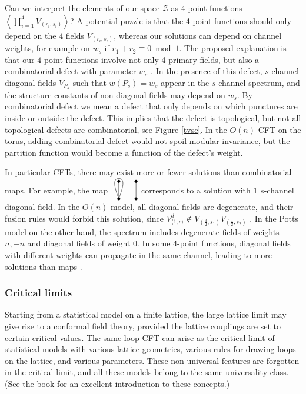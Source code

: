 \documentclass[12pt, a4paper]{article}
\newcommand{\vertices}{
\coordinate (base) at (0, 1);
\draw (0, 0) node[fill, circle, minimum size = 1.3mm, inner sep = 0]{};
  \draw (3, 0) node[fill, circle, minimum size = 1.3mm, inner sep = 0]{};
  \draw (0, 3) node[fill, circle, minimum size = 1.3mm, inner sep = 0]{};
  \draw (3, 3) node[fill, circle, minimum size = 1.3mm, inner sep = 0]{};
}
\begin{document}
Can we interpret the elements of our space $\mathcal{Z}$ as $4$-point functions $\left<\prod_{i=1}^4 V_{(r_i,s_i)}\right>$? A potential puzzle is that the 4-point functions should only depend on the 4 fields $V_{(r_i,s_i)}$, whereas our solutions can depend on channel weights, for example on $w_s$ if $r_1+r_2\equiv 0 \bmod 1$. The proposed explanation is that our $4$-point functions involve not only 4 primary fields, but also a combinatorial defect with parameter $w_s$ \cite{rib22}. In the presence of this defect, $s$-channel diagonal fields $V_{P_s}$ such that $w(P_s)=w_s$ appear in the $s$-channel spectrum, and the structure constants of non-diagonal fields may depend on $w_s$. By combinatorial defect we mean a defect that only depends on which punctures are inside or outside the defect. This implies that the defect is topological, but not all topological defects are combinatorial, see Figure \eqref{tvsc}. In the $O(n)$ CFT on the torus, adding combinatorial defect would not spoil modular invariance, but the partition function would become a function of the defect's weight. 

In particular CFTs, there may exist more or fewer solutions than combinatorial maps. 
For example, the map 
$
\begin{tikzpicture}[baseline=(base), scale = .25]
 \vertices
  \draw (0, 0) -- (0, 3);
  \draw (3, 0) -- (3, 3);
  \draw (0, 0) to [out = 70, in = 0] (0, 3.5) to [out = 180, in = 110] (0, 0);
 \end{tikzpicture}
 $
corresponds to a solution with 1 $s$-channel diagonal field.
 In the $O(n)$ model, all diagonal fields are degenerate, and their fusion rules would forbid this solution, since $V^d_{\langle 1,s\rangle}\notin V_{(\frac32,s_1)}V_{(\frac12,s_2)}$ \cite{gnjrs21}. In the Potts model on the other hand, the spectrum includes degenerate fields of weights $n,-n$ and diagonal fields of weight $0$. In some 4-point functions, diagonal fields with different weights can propagate in the same channel, leading to more solutions than maps \cite{niv22}. 
 
\subsubsection{Critical limits}

Starting from a statistical model on a finite lattice, the large lattice limit may give rise to a conformal field theory, provided the lattice couplings are set to certain critical values. The same loop CFT can arise as the critical limit of statistical models with various lattice geometries, various rules for drawing loops on the lattice, and various parameters. These non-universal features are forgotten in the critical limit, and all these models belong to the same universality class. (See the book \cite{car96} for an excellent introduction to these concepts.) 
\end{document}
